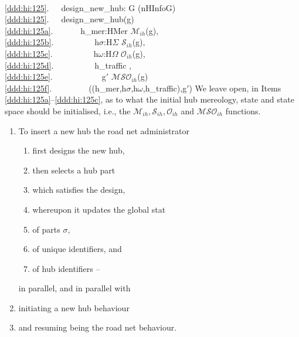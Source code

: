 {%
\bp
{}\\
\ref{ddd:hi:125}.\ \ \ design\_new\_hub: G {\RIGHTARROW} (nHInfo{\TIMES}G) \\
\ref{ddd:hi:125}.\ \ \ design\_new\_hub(g) {\IS}\ \ \\
\ref{ddd:hi:125a}.\ \ \ \ \ \  h\_mer:HMer {\EQ} $\mathcal{M}_{ih}$(g),\\
\ref{ddd:hi:125b}.\ \ \ \ \ \ \ \ \ \ h$\sigma$:H$\Sigma$ {\EQ} $\mathcal{S}_{ih}$(g),\\
\ref{ddd:hi:125c}.\ \ \ \ \ \ \ \ \ \ h$\omega$:H$\Omega$ {\EQ} $\mathcal{O}_{ih}$(g),\\
\ref{ddd:hi:125d}.\ \ \ \ \ \ \ \ \ \ h\_traffic {\EQ} {\emptymap},\\
\ref{ddd:hi:125e}.\ \ \ \ \ \ \ \ \ \ \ \ g$'$ {\EQ} $\mathcal{MSO}_{ih}$(g) \\
\ref{ddd:hi:125f}.\ \ \ \ \ \ \ \ \ ((h\_mer,h$\sigma$,h$\omega$,h\_traffic),g$'$) 
\ep
\noindent
\begynd
\pind We leave open, in Items\,\ref{ddd:hi:125a}--\ref{ddd:hi:125c},
      as to what \nyl the initial hub mereology, state and state space
      should be initialised, i.e., the $\mathcal{M}_{ih}, \mathcal{S}_{ih},
      \mathcal{O}_{ih}$ and $\mathcal{MSO}_{ih}$  functions. 
\afslut

\mnewfoil

\begin{enumerate}\setei
\item \label{hi:1000}  To insert a new hub the road net administrator
\begin{enumerate}
\item \label{hi:1002}  first designs the new hub,
\item \label{hi:1004}  then selects a hub part 
\item \label{hi:1006}  which satisfies the design,
\item[]                whereupon it updates the global stat
\item \label{hi:1010}  of parts $\sigma$,
\item \label{hi:1020}  of unique identifiers, and
\item \label{hi:1030}  of hub identifiers --
\end{enumerate} in parallel, and in parallel with
\item \label{hi:1040}  initiating a new hub behaviour
\item \label{hi:1050}  and resuming being the road net behaviour.
\savei\end{enumerate}

}
